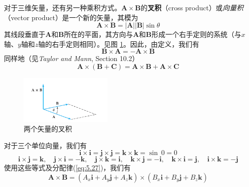     对于三维矢量，还有另一种乘积方式。$\mathbf{A}\times\mathbf{B}$的\textbf{叉积}（cross product）或\textit{向量积}（vector product）是一个新的矢量，其模为
    \begin{equation}
        \mathbf{A}\times\mathbf{B} = \left|\mathbf{A}\right|\left|\mathbf{B}\right|\sin\theta
        \label{eq:5.26}
    \end{equation}
    其线段垂直于$\mathbf{A}$和$\mathbf{B}$所在的平面，其方向与$\mathbf{A}$和$\mathbf{B}$形成一个右手定则的系统（与$x$轴、$y$轴和$z$轴的右手定则相同）。见图 \ref{fig:5.3}。因此，由定义，我们有
    \begin{equation*}
        \mathbf{B}\times\mathbf{A} = -\mathbf{A}\times\mathbf{B}
    \end{equation*}
    同样地（见\textit{Taylor and Mann}, Section 10.2）
    \begin{equation}
        \mathbf{A}\times\left(\mathbf{B}+\mathbf{C}\right) = \mathbf{A}\times\mathbf{B} + \mathbf{A}\times\mathbf{C}
        \label{eq:5.27}
    \end{equation}
    \begin{figure}[ht]
        \centering
        \includegraphics[width=0.4\textwidth]{Figures/5.3.png}
        \caption{两个矢量的叉积}
        \label{fig:5.3}
    \end{figure}
    对于三个单位向量，我们有
    \begin{equation*}
        \mathbf{i}\times\mathbf{i} = \mathbf{j}\times\mathbf{j} = \mathbf{k}\times\mathbf{k} = \sin \: 0 = 0
    \end{equation*}
    \begin{equation*}
        \mathbf{i}\times\mathbf{j} = \mathbf{k}, \quad \mathbf{j}\times\mathbf{i} = -\mathbf{k}, \quad \mathbf{j}\times\mathbf{k} = \mathbf{i}, \quad \mathbf{k}\times\mathbf{j} = -\mathbf{i}, \quad \mathbf{k}\times\mathbf{i} = \mathbf{j}, \quad \mathbf{i}\times\mathbf{k} = -\mathbf{j}
    \end{equation*}
    使用这些等式及分配律(\ref{eq:5.27})，我们有
    \begin{equation*}
        \mathbf{A}\times\mathbf{B} = \left(A_x\mathbf{i} + A_y\mathbf{j} + A_z\mathbf{k}\right)\times\left(B_x\mathbf{i} + B_y\mathbf{j} + B_z\mathbf{k}\right)
    \end{equation*}

